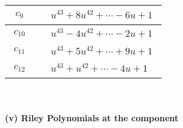 \documentclass[1p]{elsarticle_modified}
\theoremstyle{definition}
\begin{document}
\begin{tabular}{m{50pt}|m{274pt}}
\hline $$\begin{aligned}c_{9}\end{aligned}$$&$\begin{aligned}
&u^{43}+8 u^{42}+\cdots-6 u+1
\end{aligned}$\\
\hline $$\begin{aligned}c_{10}\end{aligned}$$&$\begin{aligned}
&u^{43}-4 u^{42}+\cdots-2 u+1
\end{aligned}$\\
\hline $$\begin{aligned}c_{11}\end{aligned}$$&$\begin{aligned}
&u^{43}+5 u^{42}+\cdots+9 u+1
\end{aligned}$\\
\hline $$\begin{aligned}c_{12}\end{aligned}$$&$\begin{aligned}
&u^{43}+u^{42}+\cdots-4 u+1
\end{aligned}$\\
\hline
\end{tabular}\\~\\
\newpage\renewcommand{\arraystretch}{1}
\flushleft \textbf{(v) Riley Polynomials at the component}\newline \\
\end{document}
